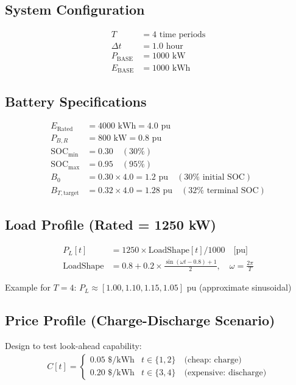 \documentclass[11pt]{article}
\begin{document}
\subsection{System Configuration}
\begin{align}
T &= 4 \text{ time periods} \\
\Delta t &= 1.0 \text{ hour} \\
P_{\text{BASE}} &= 1000 \text{ kW} \\
E_{\text{BASE}} &= 1000 \text{ kWh}
\end{align}

\subsection{Battery Specifications}
\begin{align}
E_{\text{Rated}} &= 4000 \text{ kWh} = 4.0 \text{ pu} \\
P_{B,R} &= 800 \text{ kW} = 0.8 \text{ pu} \\
\text{SOC}_{\min} &= 0.30 \quad (30\%) \\
\text{SOC}_{\max} &= 0.95 \quad (95\%) \\
B_0 &= 0.30 \times 4.0 = 1.2 \text{ pu} \quad (30\% \text{ initial SOC}) \\
B_{T,\text{target}} &= 0.32 \times 4.0 = 1.28 \text{ pu} \quad (32\% \text{ terminal SOC})
\end{align}

\subsection{Load Profile (Rated = 1250 kW)}
\begin{align}
P_L[t] &= 1250 \times \text{LoadShape}[t] / 1000 \quad \text{[pu]} \\
\text{LoadShape} &= 0.8 + 0.2 \times \frac{\sin(\omega t - 0.8) + 1}{2}, \quad \omega = \frac{2\pi}{T}
\end{align}

Example for $T = 4$: $P_L \approx [1.00, 1.10, 1.15, 1.05]$ pu (approximate sinusoidal)

\subsection{Price Profile (Charge-Discharge Scenario)}
Design to test look-ahead capability:
\begin{align}
C[t] = \begin{cases}
0.05 \text{ \$/kWh} & t \in \{1, 2\} \quad \text{(cheap: charge)} \\
0.20 \text{ \$/kWh} & t \in \{3, 4\} \quad \text{(expensive: discharge)}
\end{cases}
\end{align}
\end{document}
